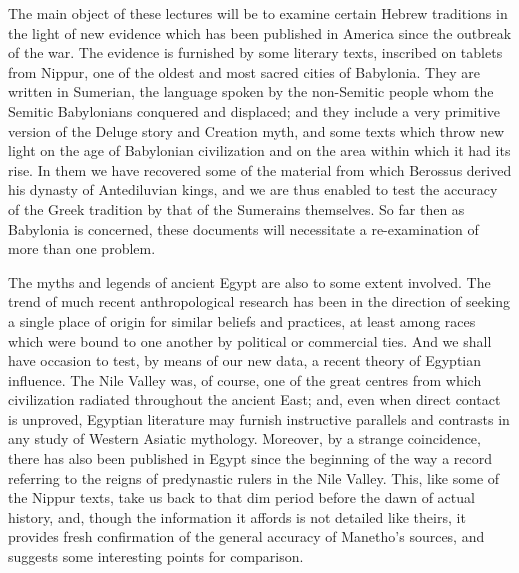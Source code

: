 \documentclass[12pt,oneside]{book}
\begin{document}
The main object of these lectures will be to examine certain Hebrew traditions in the light of new evidence which has been published in America since the outbreak of the war. The evidence is furnished by some literary texts, inscribed on tablets from Nippur, one of the oldest and most sacred cities of Babylonia. They are written in Sumerian, the language spoken by the non-Semitic people whom the Semitic Babylonians conquered and displaced; and they include a very primitive version of the Deluge story and Creation myth, and some texts which throw new light on the age of Babylonian civilization and on the area within which it had its rise. In them we have recovered some of the material from which Berossus derived his dynasty of Antediluvian kings, and we are thus enabled to test the accuracy of the Greek tradition by that of the Sumerains themselves. So far then as Babylonia is concerned, these documents will necessitate a re-examination of more than one problem. \par 

The myths and legends of ancient Egypt are also to some extent involved. The trend of much recent anthropological research has been in the direction of seeking a single place of origin for similar beliefs and practices, at least among races which were bound to one another by political or commercial ties. And we shall have occasion to test, by means of our new data, a recent theory of Egyptian influence. The Nile Valley was, of course, one of the great centres from which civilization radiated throughout the ancient East; and, even when direct contact is unproved, Egyptian literature may furnish instructive parallels and contrasts in any study of Western Asiatic mythology. Moreover, by a strange coincidence, there has also been published in Egypt since the beginning of the way a record referring to the reigns of predynastic rulers in the Nile Valley. This, like some of the Nippur texts, take us back to that dim period before the dawn of actual history, and, though the information it affords is not detailed like theirs, it provides fresh confirmation of the general accuracy of Manetho's sources, and suggests some interesting points for comparison. \par 
\end{document}
